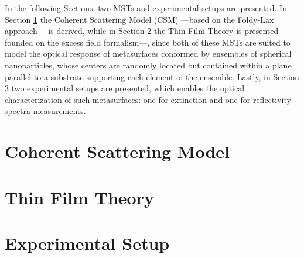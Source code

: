 \documentclass[11pt]{Latex/Classes/PhDthesisPSnPDF}
\begin{document}
	In the following Sections, two MSTs and experimental setups are presented. In Section \ref{s:CSM} the Coherent Scattering Model (CSM) ---based on the Foldy-Lax approach--- is derived, while in Section \ref{s:TFT} the Thin Film Theory is presented ---founded on the excess field formalism---, since both of these  MSTs are suited to model the optical response of metasurfaces conformed by ensembles of spherical nanoparticles, whose centers are randomly located but contained within a plane parallel to a substrate supporting each element of the ensemble. Lastly, in Section \ref{s:Setup} two experimental setups are presented, which enables the optical characterization of such metasurfaces: one for extinction and one for reflectivity spectra  measurements.
	
	\section{Coherent Scattering Model}
		\label{s:CSM}
		

	\section{Thin Film Theory}
		\label{s:TFT}
		
		
	\section{Experimental Setup}
		\label{s:Setup}
		
		
\end{document}

